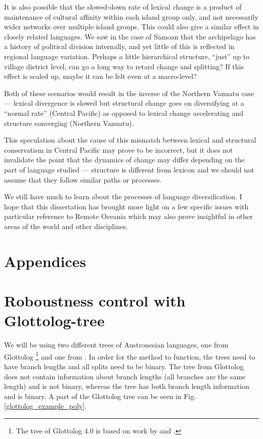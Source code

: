 \documentclass[draft,10pt]{article} %
\begin{document}
It is also possible that the slowed-down rate of lexical change is a product of maintenance of cultural affinity within each island group only, and not necessarily wider networks over multiple island groups. This could also give a similar effect in closely related languages. We saw in the case of S\={a}moan that the archipelago has a history of political division internally, and yet little of this is reflected in regional language variation. Perhaps a little hierarchical structure, ``just'' up to village district level, can go a long way to retard change and splitting? If this effect is scaled up, maybe it can be felt even at a macro-level?

Both of these scenarios would result in the inverse of the Northern Vanuatu case --- lexical divergence is slowed but structural change goes on diversifying at a ``normal rate'' (Central Pacific) as opposed to lexical change accelerating and structure converging (Northern Vanuatu).

This speculation about the cause of this mismatch between lexical and structural conservatism in Central Pacific may prove to be incorrect, but it does not invalidate the point that the dynamics of change may differ depending on the part of language studied --- structure is different from lexicon and we should not assume that they follow similar paths or processes. 

We still have much to learn about the processes of language diversification. I hope that this dissertation has brought more light on a few specific issues with particular reference to Remote Oceania which may also prove insightful in other areas of the world and other disciplines.

\newpage
\singlespacing




\newpage
\singlespacing
\appendix
\section*{Appendices}
\renewcommand{\thesubsection}{\Alph{subsection}}

\section{Roboustness control with Glottolog-tree}


We will be using two different trees of Austronesian languages, one from Glottolog \citep{glottolog40}\footnote{The tree of Glottolog 4.0 is based on work by \citet{blust_2009, blust_2014} and \citet{blust_chen_2017}.} and one from \citet{grayetal_2009}. In order for the method to function, the trees need to have branch lengths and all splits need to be binary. The tree from Glottolog does not contain information about branch lengths (all branches are the same length) and is not binary, whereas the \citet{grayetal_2009} tree has both branch length information and is binary. A part of the Glottolog tree can be seen in Fig. \ref{glottolog_example_poly}.
\end{document}
